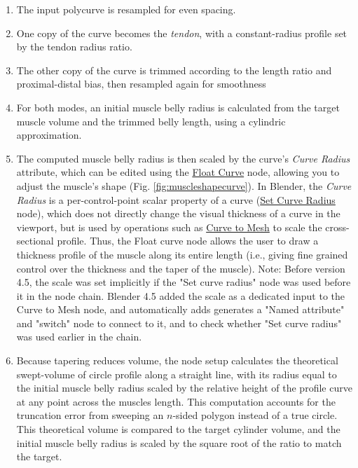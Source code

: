 \documentclass{article}
\begin{document}
\begin{enumerate}
    \item The input polycurve is resampled for even spacing.
    \item One copy of the curve becomes the \textit{tendon}, with a constant-radius profile set by the tendon radius ratio.
    \item The other copy of the curve is trimmed according to the length ratio and proximal-distal bias, then resampled again for smoothness
    \item For both modes, an initial muscle belly radius is calculated from the target muscle volume and the trimmed belly length, using a cylindric approximation.
    \item The computed muscle belly radius is then scaled by the curve's \textit{Curve Radius} attribute, which can be edited using the \href{https://docs.blender.org/manual/en/latest/compositing/types/utilities/float_curve.html}{Float Curve} node, allowing you to adjust the muscle's shape (Fig. \ref{fig:muscleshapecurve}). In Blender, the \textit{Curve Radius} is a per-control-point scalar property of a curve (\href{https://docs.blender.org/manual/en/latest/modeling/geometry_nodes/curve/write/set_curve_radius.html}{Set Curve Radius} node), which does not directly change the visual thickness of a curve in the viewport, but is used by operations such as \href{https://docs.blender.org/manual/en/latest/modeling/geometry_nodes/curve/operations/curve_to_mesh.html}{Curve to Mesh} to scale the cross-sectional profile. Thus, the Float curve node allows the user to draw a thickness profile of the muscle along its entire length (i.e., giving fine grained control over the thickness and the taper of the muscle). Note: Before version 4.5, the scale was set implicitly if the "Set curve radius" node was used before it in the node chain. Blender 4.5 added the scale as a dedicated input to the Curve to Mesh node, and automatically adds generates a "Named attribute" and "switch" node to connect to it, and to check whether "Set curve radius" was used earlier in the chain.
    \item Because tapering reduces volume, the node setup calculates the theoretical swept-volume of circle profile along a straight line, with its radius equal to the initial muscle belly radius scaled by the relative height of the profile curve at any point across the muscles length. This computation accounts for the truncation error from sweeping an $n$-sided polygon instead of a true circle. This theoretical volume is compared to the target cylinder volume, and the initial muscle belly radius is scaled by the square root of the ratio to match the target.

\end{enumerate}
\end{document}

